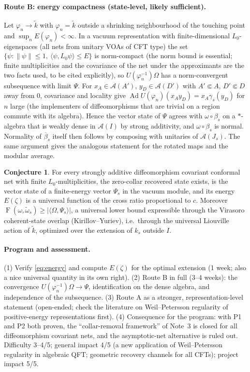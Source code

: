 \documentclass[11pt]{article}
\theoremstyle{accent}
\theoremstyle{definition}
\newcommand{\cA}{\mathcal{A}}
\newcommand{\Fid}{\operatorname{F}}
\newtheorem{conjecture}[theorem]{Conjecture}
\begin{document}
\paragraph{Route B: energy compactness (state-level, likely sufficient).}
Let \(\varphi_n\to\widetilde k\) with \(\varphi_n=\widetilde k\) outside a shrinking neighbourhood of the touching point and \(\sup_nE(\varphi_n)<\infty\).  In a vacuum representation with finite-dimensional \(L_0\)-eigenspaces (all nets from unitary VOAs of CFT type) the set \(\{\psi:\|\psi\|\le1,\ \langle\psi,L_0\psi\rangle\le E\}\) is norm-compact (the norm bound is essential; finite multiplicities and the covariance of the net under the approximants are the two facts used, to be cited explicitly), so \(U(\varphi_n^{-1})\Omega\) has a norm-convergent subsequence with limit \(\Psi\).  For \(x_A\in\cA(A')\), \(y_D\in\cA(D')\) with \(A'\Subset A\), \(D'\Subset D\) away from \(0\), covariance and locality give \(\operatorname{Ad}U(\varphi_n)(x_Ay_D)=x_A\gamma_s(y_D)\) for \(n\) large (the implementers of diffeomorphisms that are trivial on a region commute with its algebra).  Hence the vector state of \(\Psi\) agrees with \(\omega\circ\beta_s\) on a \(*\)-algebra that is weakly dense in \(\cA(I)\) by strong additivity, and \(\omega\circ\beta_s\) is normal.  Normality of \(\overline\beta_s\) itself then follows by composing with unitaries of \(\cA(J_s)\).  The same argument gives the analogous statement for the rotated maps and the modular average.

\begin{conjecture}\label{conj:collar}
For every strongly additive diffeomorphism covariant conformal net with finite \(L_0\)-multiplicities, the zero-collar recovered state exists, is the vector state of a finite-energy vector \(\Psi_s\) in the vacuum module, and its energy \(E(\zeta)\) is a universal function of the cross ratio proportional to \(c\).  Moreover \(\Fid(\omega,\widetilde\omega_s)\ge|\langle\Omega,\Psi_s\rangle|\), a universal lower bound expressible through the Virasoro coherent-state overlap (Kirillov--Yuriev), i.e.\ through the universal Liouville action of \(\widetilde k\), optimized over the extension of \(k_s\) outside \(I\).
\end{conjecture}

\paragraph{Program and assessment.}
(1) Verify \eqref{eq:energy} and compute \(E(\zeta)\) for the optimal extension (1 week; also a nice universal quantity in its own right). (2) Route B in full (3--4 weeks): the convergence \(U(\varphi_n^{-1})\Omega\to\Psi\), identification on the dense algebra, and independence of the subsequence. (3) Route A as a stronger, representation-level statement (open-ended; check the literature on Weil--Petersson regularity of positive-energy representations first). (4) Consequence for the program: with P1 and P2 both proven, the ``collar-removal framework'' of Note~3 is closed for all diffeomorphism covariant nets, and the asymptotic-net alternative is ruled out.  Difficulty 3--4/5; general impact 4/5 (a new application of Weil--Petersson regularity in algebraic QFT; geometric recovery channels for all CFTs); project impact 5/5.
\end{document}
